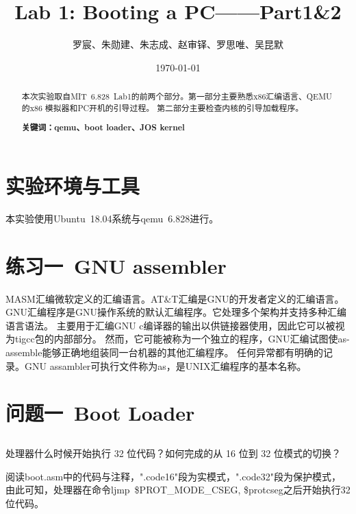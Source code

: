\documentclass[12pt,a4paper,UTF8]{article}
\begin{document}
\title{Lab 1: Booting a PC——Part1\&2}
\author{罗宸、朱勋建、朱志成、赵审铎、罗思唯、吴昆默}
\date{\today}

\maketitle

\begin{abstract}
    \setlength{\parindent}{2em}
    本次实验取自MIT\ 6.828\ Lab1的前两个部分。第一部分主要熟悉x86汇编语言、QEMU的x86 模拟器和PC开机的引导过程。
    第二部分主要检查内核的引导加载程序。

    \textbf{关键词：qemu、boot loader、JOS kernel}
\end{abstract}




\section{实验环境与工具}

本实验使用Ubuntu\ 18.04系统与qemu\ 6.828进行。


\section{练习一\ GNU assembler}

MASM汇编微软定义的汇编语言。AT\&T汇编是GNU的开发者定义的汇编语言。
GNU汇编程序是GNU操作系统的默认汇编程序。它处理多个架构并支持多种汇编语言语法。
主要用于汇编GNU c编译器的输出以供链接器使用，因此它可以被视为tigcc包的内部部分。
然而，它可能被称为一个独立的程序，GNU汇编试图使as-assemble能够正确地组装同一台机器的其他汇编程序。
任何异常都有明确的记录。GNU assambler可执行文件称为as，是UNIX汇编程序的基本名称。


\section{问题一\ Boot Loader}

    \subsection{}
	处理器什么时候开始执行 32 位代码？如何完成的从 16 位到 32 位模式的切换？

	阅读boot.asm中的代码与注释，".code16"段为实模式，".code32"段为保护模式，
	由此可知，处理器在命令ljmp\ \$PROT\_MODE\_CSEG, \$protcseg之后开始执行32位代码。
\end{document}
